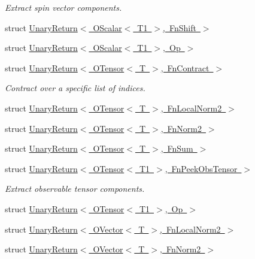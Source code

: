 \begin{DoxyCompactItemize}
\begin{DoxyCompactList}\small\item\em Extract spin vector components. \end{DoxyCompactList}\item 
struct \mbox{\hyperlink{structENSEM_1_1UnaryReturn_3_01OScalar_3_01T1_01_4_00_01FnShift_01_4}{Unary\+Return$<$ O\+Scalar$<$ T1 $>$, Fn\+Shift $>$}}
\item 
struct \mbox{\hyperlink{structENSEM_1_1UnaryReturn_3_01OScalar_3_01T1_01_4_00_01Op_01_4}{Unary\+Return$<$ O\+Scalar$<$ T1 $>$, Op $>$}}
\item 
struct \mbox{\hyperlink{structENSEM_1_1UnaryReturn_3_01OTensor_3_01T_01_4_00_01FnContract_01_4}{Unary\+Return$<$ O\+Tensor$<$ T $>$, Fn\+Contract $>$}}
\begin{DoxyCompactList}\small\item\em Contract over a specific list of indices. \end{DoxyCompactList}\item 
struct \mbox{\hyperlink{structENSEM_1_1UnaryReturn_3_01OTensor_3_01T_01_4_00_01FnLocalNorm2_01_4}{Unary\+Return$<$ O\+Tensor$<$ T $>$, Fn\+Local\+Norm2 $>$}}
\item 
struct \mbox{\hyperlink{structENSEM_1_1UnaryReturn_3_01OTensor_3_01T_01_4_00_01FnNorm2_01_4}{Unary\+Return$<$ O\+Tensor$<$ T $>$, Fn\+Norm2 $>$}}
\item 
struct \mbox{\hyperlink{structENSEM_1_1UnaryReturn_3_01OTensor_3_01T_01_4_00_01FnSum_01_4}{Unary\+Return$<$ O\+Tensor$<$ T $>$, Fn\+Sum $>$}}
\item 
struct \mbox{\hyperlink{structENSEM_1_1UnaryReturn_3_01OTensor_3_01T1_01_4_00_01FnPeekObsTensor_01_4}{Unary\+Return$<$ O\+Tensor$<$ T1 $>$, Fn\+Peek\+Obs\+Tensor $>$}}
\begin{DoxyCompactList}\small\item\em Extract observable tensor components. \end{DoxyCompactList}\item 
struct \mbox{\hyperlink{structENSEM_1_1UnaryReturn_3_01OTensor_3_01T1_01_4_00_01Op_01_4}{Unary\+Return$<$ O\+Tensor$<$ T1 $>$, Op $>$}}
\item 
struct \mbox{\hyperlink{structENSEM_1_1UnaryReturn_3_01OVector_3_01T_01_4_00_01FnLocalNorm2_01_4}{Unary\+Return$<$ O\+Vector$<$ T $>$, Fn\+Local\+Norm2 $>$}}
\item 
struct \mbox{\hyperlink{structENSEM_1_1UnaryReturn_3_01OVector_3_01T_01_4_00_01FnNorm2_01_4}{Unary\+Return$<$ O\+Vector$<$ T $>$, Fn\+Norm2 $>$}}

\end{DoxyCompactItemize}
